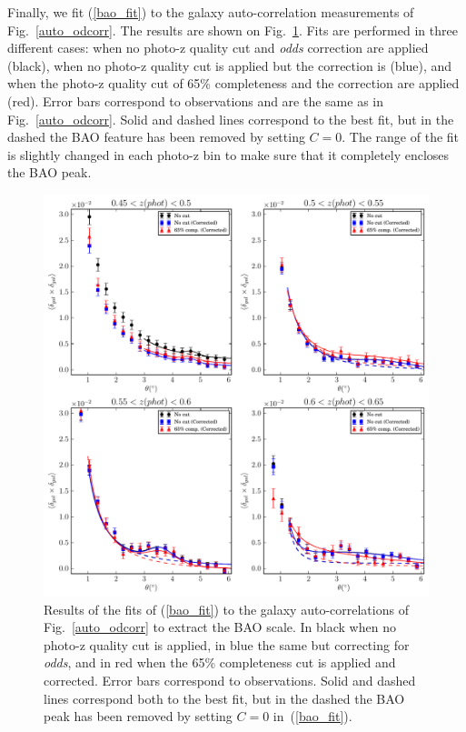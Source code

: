 Finally, we fit (\ref{bao_fit}) to the galaxy auto-correlation measurements of Fig.~\ref{auto_odcorr}. The results are shown on Fig.~\ref{bao_4bins}. Fits are performed in three different cases: when no photo-z quality cut and \textit{odds} correction are applied (black), when no photo-z quality cut is applied but the correction is (blue), and when the photo-z quality cut of 65\% completeness and the correction are applied (red). Error bars correspond to observations and are the same as in Fig.~\ref{auto_odcorr}. 
Solid and dashed lines correspond to the best fit, but in the dashed the BAO feature has been removed by setting $C=0$. The range of the fit is slightly changed in each photo-z bin to make sure that it completely encloses the BAO peak.
\begin{figure}
\centering
\includegraphics[type=pdf,ext=.pdf,read=.pdf, width=130mm]{./plots/bao_4bins_narrow}
\caption{Results of the fits of (\ref{bao_fit}) to the galaxy auto-correlations of Fig.~\ref{auto_odcorr} to extract the BAO scale. In black when no photo-z quality cut is applied, in blue the same but correcting for \textit{odds}, and in red when the 65\% completeness cut is applied and corrected. Error bars correspond to observations. Solid and dashed lines correspond both to the best fit, but in the dashed the BAO peak has been removed by setting $C=0$ in~(\ref{bao_fit}). 
}
\label{bao_4bins}
\end{figure}
%

